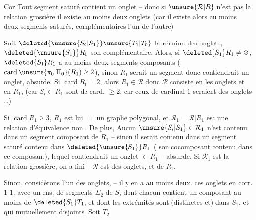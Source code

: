 \uline{Cor} Tout  segment saturé contient un onglet -- donc si $\unsure{\mathcal{R}|R}$ n'est pas la relation grossière il existe au moins deux onglets (car il existe alors au moins deux segments saturés, complémentaires l'un de l'autre)

Soit  $\deleted{\unsure{S_{0}|S_1}}\unsure{T_{1}|T_{0}}$ la réunion des onglets, $\deleted{\unsure{S_1}}R_1$ son complémentaire. Alors, si $\deleted{S_1}R_1\ne\varnothing$, $\deleted{S_1}R_1$ a au moins deux segments composants ($\operatorname{card}\unsure{\pi_0|\Pi_0}(R_1)\geq 2$), sinon $R_1$ serait un segment donc contiendrait un onglet, absurde. Si $\operatorname{card} R_1=2$, alors $R_1\in\mathcal{R}$  donc $\mathcal{R}$ consiste en les onglets et en $R_1$, (car   $S_i\subset R_1$ sont de card. $\geq 2$,  car ceux de cardinal $1$ seraient des onglets \ldots)

Si $\operatorname{card} R_1\geq 3$, $R_1$ est lui $=$ un graphe polygonal, et $\mathcal{R}_1=\mathcal{R}\vert R_1$ est une relation d'équivalence non . De plus, Aucun $\unsure{S_i|S_1}\in\mathcal{R}_1$ n'est contenu dans un segment composant de $R_1$ -- sinon il serait contenu dans un segment saturé contenu dans $\deleted{\unsure{S_1}}R_1$ ( son cocomposant contenu dans ce composant), lequel contiendrait un onglet $\subset R_1$ -- absurde. Si $\mathcal{R}_1$ est la relation grossière, on a fini -- $\mathcal{R}$ est  des onglets, et de $R_1$.

Sinon, considérons l'un des onglets,  -- il y en a au moins deux.  ces onglets  en corr. $1$-$1$. avec un ens. de \unsure{(}segments $\Sigma_2$ de $S$, dont chacun contient un composant au moins de $\deleted{S_1}T_1$, et dont les extrémités sont (distinctes et) dans $S_1$, et qui  mutuellement disjoints. Soit $T_2$


